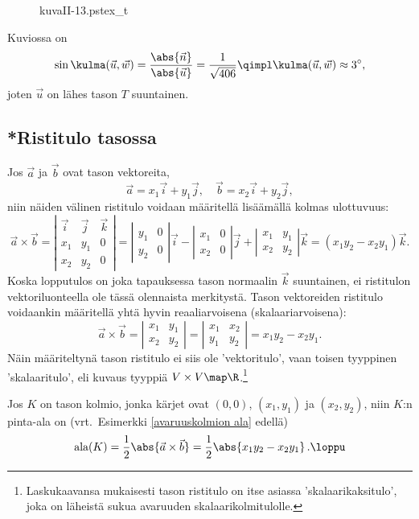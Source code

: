 \begin{figure}[H]
\begin{center}
{kuvaII-13.pstex_t}
\end{center}
\end{figure}
Kuviossa on
\[
\sin{\kulma (\vec u, \vec w)} = \frac{\abs{\vec n}}{\abs{\vec u}} = \frac{1}{\sqrt{406}}
                                \qimpl \kulma (\vec u, \vec w) \approx 3^{\circ},
\]
joten $\vec u$ on lähes tason $T$ suuntainen. \loppu

\pagebreak

\subsection{*Ristitulo tasossa}

Jos $\vec a$ ja $\vec b$ ovat tason vektoreita, 
\[
\vec a=x_1\vec i + y_1 \vec j, \quad \vec b=x_2\vec i + y_2 \vec j,
\]
niin näiden välinen ristitulo voidaan määritellä lisäämällä kolmas ulottuvuus:
\[
\vec a \times \vec b = \left| \begin{array}{ccc}
\vec i & \vec j & \vec k \\
x_1 & y_1 & 0 \\
x_2 & y_2 & 0 
\end{array} \right|
=
\left|\begin{array}{cc} 
y_1 & 0 \\
y_2 & 0
\end{array} \right| \vec i -
\left|\begin{array}{cc} 
x_1 & 0 \\
x_2 & 0
\end{array} \right| \vec j +
\left|\begin{array}{cc} 
x_1 & y_1 \\
x_2 & y_2
\end{array} \right| \vec k
=(x_1y_2-x_2y_1)\vec k.
\]
Koska lopputulos on joka tapauksessa tason normaalin $\vec k$ suuntainen, ei ristitulon
vektoriluonteella ole tässä olennaista merkitystä. Tason vektoreiden ristitulo voidaankin
määritellä yhtä hyvin reaaliarvoisena (skalaariarvoisena):
\[
\vec a \times \vec b = \left|\begin{array}{cc} x_1 & y_1 \\ x_2 & y_2 \end{array} \right| 
                     = \left|\begin{array}{cc} x_1 & x_2 \\ y_1 & y_2 \end{array} \right|
                     = x_1y_2-x_2y_1.
\]
Näin määriteltynä tason ristitulo ei siis ole 'vektoritulo', vaan toisen tyyppinen 
'skalaaritulo', eli kuvaus tyyppiä $V \times V \map \R$.\footnote[1]{Laskukaavansa mukaisesti
tason ristitulo on itse asiassa 'skalaarikaksitulo', joka on läheistä sukua avaruuden
skalaarikolmitulolle.} 
\begin{Exa} Jos $K$ on tason kolmio, jonka kärjet ovat $(0,0)$, $(x_1,y_1)$ ja $(x_2,y_2)$,
niin $K$:n pinta-ala on (vrt.\ Esimerkki \ref{avaruuskolmion ala} edellä)
\[
\text{ala}(K)=\frac{1}{2}\abs{\vec a\times\vec b}=\frac{1}{2}\abs{x_1y_2-x_2y_1}\,. \loppu
\]
\end{Exa}

